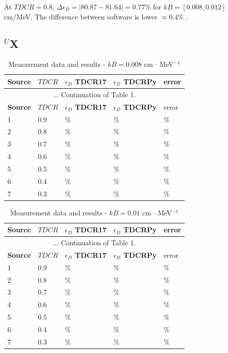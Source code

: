 \documentclass[12pt]{iopart}
\begin{document}
At $TDCR = 0.8$, $\Delta \epsilon_D = |80.87 - 81.64| = 0.77 \%$ for $kB = [0.008, 0.012]$ cm/MeV. The difference between software is lower $\approx 0.4 \%$ . 


\pagebreak
\subsection{$^{U}$X}

\begingroup
\footnotesize
\begin{longtable}[l]{| p{} | p{} |p{} |p{} |p{} |} 
\caption{Measurement data and results - $kB = 0.008$ cm $\cdot$ MeV$^{-1}$}
\label{Table1} \\ 
\hline
\textbf{Source} & \textbf{$TDCR$} & \textbf{$\epsilon_{D}$ TDCR17} & \textbf{$\epsilon_{D}$ TDCRPy} & error \\
\endfirsthead
\multicolumn{5}{c}{... Continuation of Table 1.}\\ 
\hline
 \textbf{Source} & \textbf{$TDCR$} & \textbf{$\epsilon_{D}$ TDCR17} & \textbf{$\epsilon_{D}$ TDCRPy} & error \\   \hline 
\endhead
\hline
 1 & 0.9   &    \% &    \% &   \% \\
 2 & 0.8   &    \% &    \% &   \% \\
 3 & 0.7   &    \% &    \% &   \% \\
 4 & 0.6   &    \% &    \% &   \% \\
 5 & 0.5   &    \% &    \% &   \% \\
 6 & 0.4   &    \% &    \% &   \% \\
 7 & 0.3   &    \% &    \% &   \% \\
\hline
\end{longtable} 
\endgroup


\begingroup
\footnotesize
\begin{longtable}[l]{| p{} | p{} | p{} |p{} |p{} |} 
\caption{Measurement data and results - $kB = 0.01$ cm $\cdot$ MeV$^{-1}$}
\label{Table1} \\ 
\hline
\textbf{Source} & \textbf{$TDCR$} & \textbf{$\epsilon_{D}$ TDCR17} & \textbf{$\epsilon_{D}$ TDCRPy} & error \\ 
\endfirsthead
\multicolumn{5}{c}{... Continuation of Table 1.}\\ 
\hline
 \textbf{Source} & \textbf{$TDCR$} & \textbf{$\epsilon_{D}$ TDCR17} & \textbf{$\epsilon_{D}$ TDCRPy} & error \\   \hline 
\endhead
\hline
 1 &  0.9  &   \% &    \% &  \% \\
 2 &  0.8  &   \% &    \% &  \% \\
 3 &  0.7  &   \% &    \% &  \% \\
 4 &  0.6  &   \% &    \% &  \% \\
 5 &  0.5  &   \% &    \% &  \% \\
 6 &  0.4  &   \% &    \% &  \% \\
 7 &  0.3  &   \% &    \% &  \% \\
\hline
\end{longtable} 
\endgroup
\end{document}

